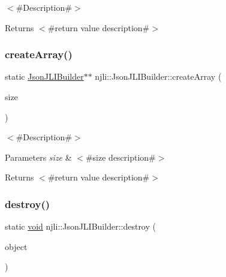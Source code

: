 $<$\#\+Description\#$>$

\begin{DoxyReturn}{Returns}
$<$\#return value description\#$>$ 
\end{DoxyReturn}
\mbox{\label{classnjli_1_1_json_j_l_i_builder_acbd403462d6aef60de6c89832b5690be}} 
\subsubsection{\texorpdfstring{create\+Array()}{createArray()}}
{\footnotesize\ttfamily static \mbox{\hyperlink{classnjli_1_1_json_j_l_i_builder}{Json\+J\+L\+I\+Builder}}$\ast$$\ast$ njli\+::\+Json\+J\+L\+I\+Builder\+::create\+Array (\begin{DoxyParamCaption}\item[{const \mbox{\hyperlink{_util_8h_a10e94b422ef0c20dcdec20d31a1f5049}{u32}}}]{size }\end{DoxyParamCaption})\hspace{0.3cm}{\ttfamily [static]}}

$<$\#\+Description\#$>$


\begin{DoxyParams}{Parameters}
{\em size} & $<$\#size description\#$>$\\
\hline
\end{DoxyParams}
\begin{DoxyReturn}{Returns}
$<$\#return value description\#$>$ 
\end{DoxyReturn}
\mbox{\label{classnjli_1_1_json_j_l_i_builder_a825fd69ba4e09e5055153ed490966f43}} 
\subsubsection{\texorpdfstring{destroy()}{destroy()}}
{\footnotesize\ttfamily static \mbox{\hyperlink{_thread_8h_af1e856da2e658414cb2456cb6f7ebc66}{void}} njli\+::\+Json\+J\+L\+I\+Builder\+::destroy (\begin{DoxyParamCaption}\item[{\mbox{\hyperlink{classnjli_1_1_json_j_l_i_builder}{Json\+J\+L\+I\+Builder}} $\ast$}]{object }\end{DoxyParamCaption})\hspace{0.3cm}{\ttfamily [static]}}

